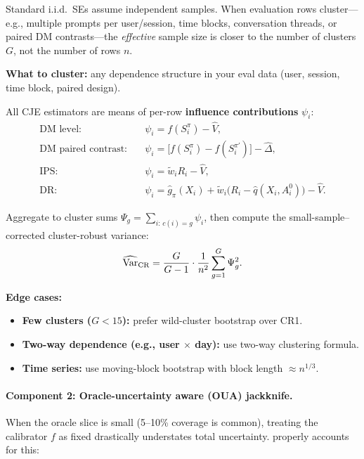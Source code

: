 \begin{enumerate}[resume]
Standard i.i.d.\ SEs assume independent samples. When evaluation rows cluster---e.g., multiple prompts per user/session, time blocks, conversation threads, or paired DM contrasts---the \emph{effective} sample size is closer to the number of clusters $G$, not the number of rows $n$.

\textbf{What to cluster:} any dependence structure in your eval data (user, session, time block, paired design).

All CJE estimators are means of per-row \textbf{influence contributions} $\psi_i$:
\begin{align*}
\text{DM level:} \quad &\psi_i = f(S_i^\pi) - \hat{V}, \\
\text{DM paired contrast:} \quad &\psi_i = \bigl[f(S_i^\pi) - f(S_i^{\pi'})\bigr] - \widehat{\Delta}, \\
\text{IPS:} \quad &\psi_i = \tilde{w}_i R_i - \hat{V}, \\
\text{DR:} \quad &\psi_i = \hat{g}_\pi(X_i) + \tilde{w}_i\bigl(R_i - \hat{q}(X_i, A_i^0)\bigr) - \hat{V}.
\end{align*}

Aggregate to cluster sums $\Psi_g = \sum_{i:\, c(i)=g} \psi_i$, then compute the small-sample--corrected cluster-robust variance:
\begin{equation}
\widehat{\operatorname{Var}}_{\text{CR}} = \frac{G}{G-1} \cdot \frac{1}{n^2} \sum_{g=1}^G \Psi_g^2.
\end{equation}

\textbf{Edge cases:}
\begin{itemize}
\item \textbf{Few clusters ($G < 15$):} prefer wild-cluster bootstrap over CR1.
\item \textbf{Two-way dependence (e.g., user $\times$ day):} use two-way clustering formula.
\item \textbf{Time series:} use moving-block bootstrap with block length $\approx n^{1/3}$.
\end{itemize}

\paragraph{Component 2: Oracle-uncertainty aware (OUA) jackknife.}

When the oracle slice is small (5--10\% coverage is common), treating the calibrator $f$ as fixed drastically understates total uncertainty. \oua{} properly accounts for this:


\end{enumerate}
